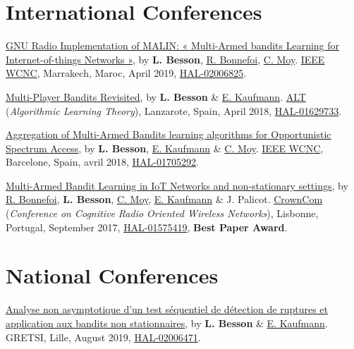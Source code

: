 \section*{International Conferences}
\renewcommand{\labelenumi}{[IC-\arabic{enumi}]}
\begin{etaremune}
\item
  \href{https://perso.crans.org/besson/articles/BBM__IEEE_WCNC_2019.pdf}{GNU
  Radio Implementation of MALIN: « Multi-Armed bandits Learning for
  Internet-of-things Networks »}, by \textbf{L. Besson},
  \href{https://remibonnefoi.wordpress.com/}{R. Bonnefoi},
  \href{https://moychris.wordpress.com/}{C. Moy}.
  \href{http://wcnc2019.ieee-wcnc.org/}{IEEE WCNC},
  Marrakech, Maroc, April 2019, \href{https://hal.inria.fr/hal-02006825}{HAL-02006825}.
  \cite{Besson2019WCNC}
\item
  \href{https://hal.inria.fr/hal-01629733/document}{Multi-Player Bandits
  Revisited}, by \textbf{L. Besson} \&
  \href{http://chercheurs.lille.inria.fr/ekaufman/research.html}{E.
  Kaufmann}.
  \href{http://www.cs.cornell.edu/conferences/alt2018/accepted.html}{ALT}
  (\emph{Algorithmic Learning Theory}), Lanzarote, Spain, April 2018,
  \href{https://hal.inria.fr/hal-01629733}{HAL-01629733}.
  \cite{Besson2018ALT}
\item
  \href{https://hal.inria.fr/hal-01705292/document}{Aggregation of
  Multi-Armed Bandits learning algorithms for Opportunistic Spectrum
  Access}, by \textbf{L. Besson},
  \href{http://chercheurs.lille.inria.fr/ekaufman/research.html}{E.
  Kaufmann} \& \href{https://moychris.wordpress.com/}{C. Moy}.
  \href{http://wcnc2018.ieee-wcnc.org/}{IEEE WCNC}, Barcelone, Spain,
  avril 2018, \href{https://hal.inria.fr/hal-01705292}{HAL-01705292}.
  \cite{Besson2018WCNC}
\item
  \href{https://hal.inria.fr/hal-01575419/document}{Multi-Armed Bandit
  Learning in IoT Networks and non-stationary settings}, by
  \href{https://remibonnefoi.wordpress.com/}{R. Bonnefoi}, \textbf{L.
  Besson}, \href{https://moychris.wordpress.com/}{C. Moy},
  \href{http://chercheurs.lille.inria.fr/ekaufman/research.html}{E.
  Kaufmann} \& J. Palicot. \href{http://crowncom.org/2017/}{CrownCom}
  (\emph{Conference on Cognitive Radio Oriented Wireless Networks}),
  Lisbonne, Portugal, September 2017,
  \href{https://hal.inria.fr/hal-01575419}{HAL-01575419}, \textbf{Best Paper Award}.
  \cite{Bonnefoi17}
\end{etaremune}


\section*{National Conferences}
\renewcommand{\labelenumi}{[NC-\arabic{enumi}]}
\begin{etaremune}
\item
  \href{https://hal.inria.fr/hal-02006471/document}{Analyse non asymptotique d'un test séquentiel de détection de ruptures et application aux bandits non stationnaires}, by \textbf{L. Besson} \&
  \href{http://chercheurs.lille.inria.fr/ekaufman/research.html}{E.
  Kaufmann}.
  GRETSI, Lille, August 2019,
  \href{https://hal.inria.fr/hal-02006471}{HAL-02006471}.
  \cite{Besson2019Gretsi}
\end{etaremune}



